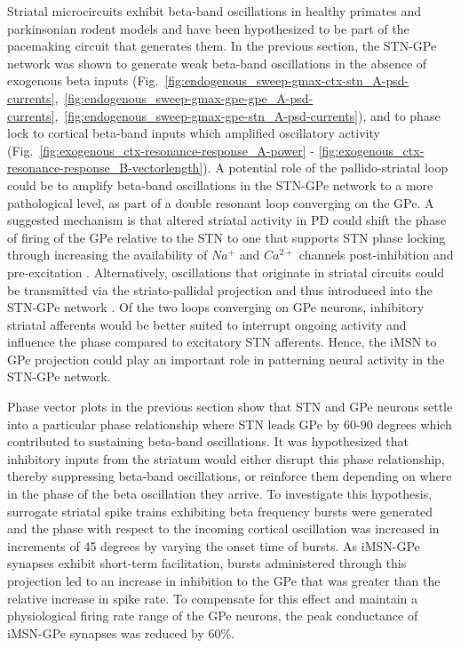 %
Striatal microcircuits exhibit beta-band oscillations in healthy primates \cite{feingold_bursts_2015} and parkinsonian rodent models \cite{mccarthy_striatal_2011,sharott_population_2017} and have been hypothesized to be part of the pacemaking circuit that generates them. In the previous section, the STN-GPe network was shown to generate weak beta-band oscillations in the absence of exogenous beta inputs  (Fig.~\ref{fig:endogenous_sweep-gmax-ctx-stn_A-psd-currents},~\ref{fig:endogenous_sweep-gmax-gpe-gpe_A-psd-currents},~\ref{fig:endogenous_sweep-gmax-gpe-stn_A-psd-currents}), and to phase lock to cortical beta-band inputs which amplified oscillatory activity (Fig.~\ref{fig:exogenous_ctx-resonance-response_A-power} - \ref{fig:exogenous_ctx-resonance-response_B-vectorlength}). A potential role of the pallido-striatal loop could be to amplify beta-band oscillations in the STN-GPe network to a more pathological level, as part of a double resonant loop converging on the GPe. A suggested mechanism is that altered striatal activity in PD could shift the phase of firing of the GPe relative to the STN to one that supports STN phase locking through increasing the availability of $Na^{+}$ and $Ca^{2+}$ channels post-inhibition and pre-excitation \cite{baufreton_enhancement_2005,mallet_parkinsonian_2008,mallet_dichotomous_2012}. Alternatively, oscillations that originate in striatal circuits could be transmitted via the striato-pallidal projection and thus introduced into the STN-GPe network \cite{mccarthy_striatal_2011,corbit_pallidostriatal_2016}. Of the two loops converging on GPe neurons, inhibitory striatal afferents would be better suited to interrupt ongoing activity and influence the phase compared to excitatory STN afferents. Hence, the iMSN to GPe projection could play an important role in patterning neural activity in the STN-GPe network.
%

Phase vector plots in the previous section show that STN and GPe neurons settle into a particular phase relationship where STN leads GPe by 60-90 degrees which contributed to sustaining beta-band oscillations. It was hypothesized that inhibitory inputs from the striatum would either disrupt this phase relationship, thereby suppressing beta-band oscillations, or reinforce them depending on where in the phase of the beta oscillation they arrive. To investigate this hypothesis, surrogate striatal spike trains exhibiting beta frequency bursts were generated and the phase with respect to the incoming cortical oscillation was increased in increments of 45 degrees by varying the onset time of bursts. As iMSN-GPe synapses exhibit short-term facilitation, bursts administered through this projection led to an increase in inhibition to the GPe that was greater than the relative increase in spike rate. To compensate for this effect and maintain a physiological firing rate range of the GPe neurons, the peak conductance of iMSN-GPe synapses was reduced by 60\%.

